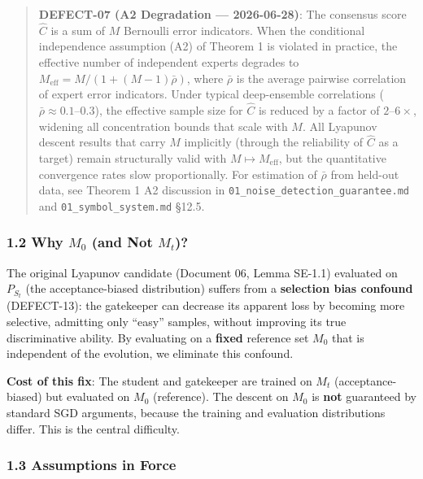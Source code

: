 \documentclass[
  12pt,
]{ctexart}
\begin{document}
\begin{quote}
\textbf{DEFECT-07 (A2 Degradation --- 2026-06-28)}: The consensus score
\(\hat{C}\) is a sum of \(M\) Bernoulli error indicators. When the
conditional independence assumption (A2) of Theorem 1 is violated in
practice, the effective number of independent experts degrades to
\(M_{\text{eff}} = M / (1 + (M-1)\bar{\rho})\), where \(\bar{\rho}\) is
the average pairwise correlation of expert error indicators. Under
typical deep-ensemble correlations
(\(\bar{\rho} \approx 0.1\)--\(0.3\)), the effective sample size for
\(\hat{C}\) is reduced by a factor of \(2\)--\(6\times\), widening all
concentration bounds that scale with \(M\). All Lyapunov descent results
that carry \(M\) implicitly (through the reliability of \(\hat{C}\) as a
target) remain structurally valid with \(M \mapsto M_{\text{eff}}\), but
the quantitative convergence rates slow proportionally. For estimation
of \(\bar{\rho}\) from held-out data, see Theorem 1 A2 discussion in
\texttt{01\_noise\_detection\_guarantee.md} and
\texttt{01\_symbol\_system.md} §12.5.
\end{quote}

\subsubsection{\texorpdfstring{1.2 Why \(M_0\) (and Not
\(M_t\))?}{1.2 Why M\_0 (and Not M\_t)?}}\label{why-m_0-and-not-m_t}

The original Lyapunov candidate (Document 06, Lemma SE-1.1) evaluated on
\(P_{S_t}\) (the acceptance-biased distribution) suffers from a
\textbf{selection bias confound} (DEFECT-13): the gatekeeper can
decrease its apparent loss by becoming more selective, admitting only
``easy'' samples, without improving its true discriminative ability. By
evaluating on a \textbf{fixed} reference set \(M_0\) that is independent
of the evolution, we eliminate this confound.

\textbf{Cost of this fix}: The student and gatekeeper are trained on
\(M_t\) (acceptance-biased) but evaluated on \(M_0\) (reference). The
descent on \(M_0\) is \textbf{not} guaranteed by standard SGD arguments,
because the training and evaluation distributions differ. This is the
central difficulty.

\subsubsection{1.3 Assumptions in Force}\label{assumptions-in-force}
\end{document}

